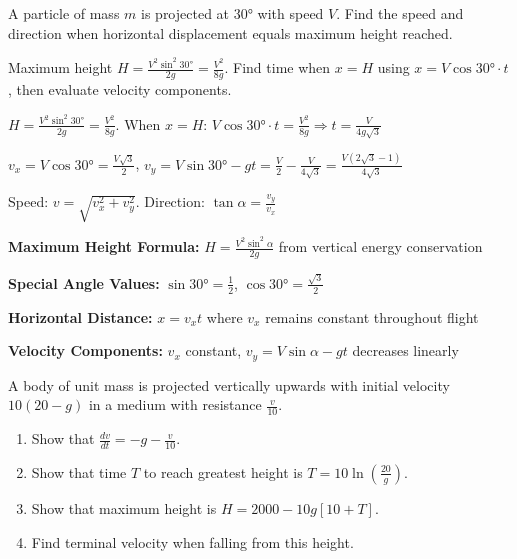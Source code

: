 \begin{problem}
A particle of mass $m$ is projected at $30°$ with speed $V$. Find the speed and direction when horizontal displacement equals maximum height reached.
\end{problem}

\begin{hint}
Maximum height $H = \frac{V^2\sin^2 30°}{2g} = \frac{V^2}{8g}$. Find time when $x = H$ using $x = V\cos 30° \cdot t$, then evaluate velocity components.
\end{hint}

\begin{solution}
$H = \frac{V^2\sin^2 30°}{2g} = \frac{V^2}{8g}$. When $x = H$: $V\cos 30° \cdot t = \frac{V^2}{8g} \Rightarrow t = \frac{V}{4g\sqrt{3}}$

$v_x = V\cos 30° = \frac{V\sqrt{3}}{2}$, $v_y = V\sin 30° - gt = \frac{V}{2} - \frac{V}{4\sqrt{3}} = \frac{V(2\sqrt{3}-1)}{4\sqrt{3}}$

Speed: $v = \sqrt{v_x^2 + v_y^2}$. Direction: $\tan\alpha = \frac{v_y}{v_x}$
\end{solution}

\begin{takeaways}
\item \textbf{Maximum Height Formula:} $H = \frac{V^2\sin^2\alpha}{2g}$ from vertical energy conservation
\item \textbf{Special Angle Values:} $\sin 30° = \frac{1}{2}$, $\cos 30° = \frac{\sqrt{3}}{2}$
\item \textbf{Horizontal Distance:} $x = v_x t$ where $v_x$ remains constant throughout flight
\item \textbf{Velocity Components:} $v_x$ constant, $v_y = V\sin\alpha - gt$ decreases linearly
\end{takeaways}

\begin{problem}
A body of unit mass is projected vertically upwards with initial velocity $10(20-g)$ in a medium with resistance $\frac{v}{10}$.
\begin{enumerate}[label=\textbf{\roman*.}]
    \item Show that $\frac{dv}{dt} = -g - \frac{v}{10}$.
    \item Show that time $T$ to reach greatest height is $T = 10 \ln\left(\frac{20}{g}\right)$.
    \item Show that maximum height is $H = 2000 - 10g[10 + T]$.
    \item Find terminal velocity when falling from this height.
\end{enumerate}
\end{problem}

